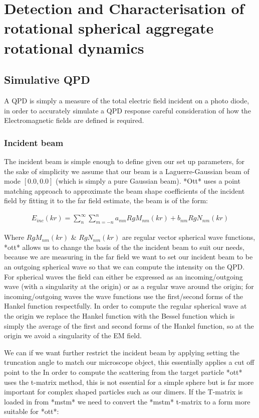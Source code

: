 \chapter{Detection and Characterisation of rotational spherical aggregate rotational dynamics}
\label{chapter:simulated_detection}
\section{Simulative QPD}
A QPD is simply a measure of the total electric field incident on a photo diode, in order to accurately simulate a QPD response careful consideration of how the Electromagnetic fields are defined is required. 

\subsection{Incident beam}
\label{sec:scattering}
The incident beam is simple enough to define given our set up parameters, for the sake of simplicity we assume that our beam is a Laguerre-Gaussian beam of mode $[0.0, 0.0]$ (which is simply a pure Gaussian beam). *Ott* uses a point matching approach to approximate the beam shape coefficients of the incident field by fitting it to the far field estimate, the beam is of the form:

\begin{align}
	E_{inc}(kr)=\sum^\infty_n\sum^n_{m=-n}a_{mn}RgM_{nm}(kr)+b_{nm}RgN_{nm}(kr)
\end{align}

Where $RgM_{nm}(kr)$ \& $RgN_{nm}(kr)$ are regular vector spherical wave functions, *ott* allows us to change the basis of the the incident beam to suit our needs, because we are measuring in the far field we want to set our incident beam to be an outgoing spherical wave so that we can compute the intensity on the QPD. For spherical waves the field can either be expressed as an incoming/outgoing wave (with a singularity at the origin) or as a regular wave around the origin; for incoming/outgoing waves the wave functions use the first/second forms of the Hankel function respectfully. In order to compute the regular spherical wave at the origin we replace the Hankel function with the Bessel function which is simply the average of the first and second forms of the Hankel function, so at the origin we avoid a singularity of the EM field.  

We can if we want further restrict the incident beam by applying setting the truncation angle to match our microscope object, this essentially applies a cut off point to the In order to compute the scattering from the target particle *ott* uses the t-matrix method, this is not essential for a simple sphere but is far more important for complex shaped particles such as our dimers. If the T-matrix is loaded in from *mstm* we need to convert the *mstm* t-matrix to a form more suitable for *ott*:

